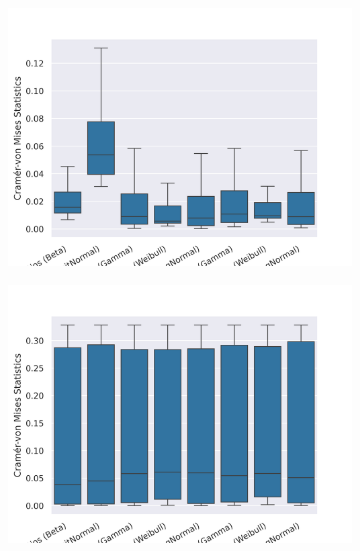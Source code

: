\documentclass[10pt,letterpaper]{article}
\begin{document}
\begin{figure}[h!]
	\begin{subfigure}[b]{0.45\textwidth}
		\centering
		\includegraphics[width=\textwidth]{figures/yule-400-ccd1-cvm.png}
	\end{subfigure}
	\begin{subfigure}[b]{0.45\textwidth}
		\centering
		\includegraphics[width=\textwidth]{figures/bio-ccd1-cvm.png}
	\end{subfigure}
	
	\label{fig:cramer-von-mises}
\end{figure}
\end{document}
